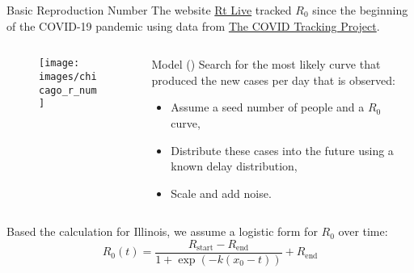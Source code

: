 \begin{slide}{Basic Reproduction Number}
\vfill
The website \href{https://rt.live/}{Rt Live} tracked $R_0$ since the beginning of the COVID-19 pandemic using data from \href{https://covidtracking.com/?source=rt}{The COVID Tracking Project}.
\begin{columns}[T]
	\begin{column}{.5\textwidth}
		\begin{figure}[h]
			\centering
			\texttt{[image: images/chicago\_r\_num]}	
		\end{figure}
	\end{column}
	\begin{column}{.5\textwidth}
		\begin{block}{Model (\cite{rtlive2020})}
			Search for the most likely curve that produced the new cases per day that is observed:
			\begin{itemize}
				\item Assume a seed number of people and a $R_0$ curve,
				\item Distribute these cases into the future using a known delay distribution,
				\item Scale and add noise.
			\end{itemize}
		\end{block}
	\end{column}
\end{columns}
\vfill
Based the calculation for Illinois, we assume a logistic form for $R_0$ over time:
$$R_0 (t) = \frac{R_{\text{start}} - R_{\text{end}}}{1 + \exp ( - k (x_0 - t))} + R_{\text{end}}$$
\vfill
\end{slide}